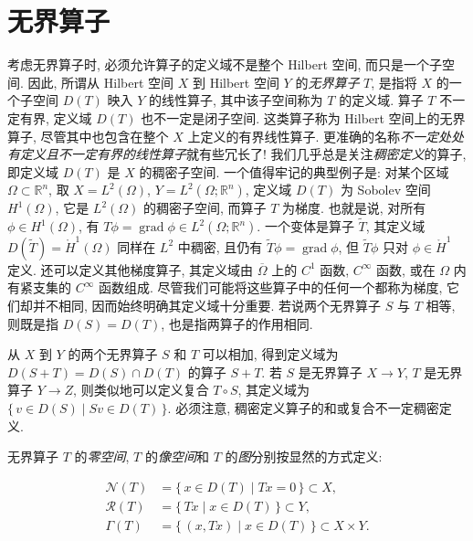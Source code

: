 \section{{无界算子}}\label{sec:unbounded-operators}

{考虑无界算子时, 必须允许算子的定义域不是整个 Hilbert 空间, 而只是一个子空间. 因此, 所谓从 Hilbert 空间 $X$ 到 Hilbert 空间 $Y$ 的\emph{无界算子} $T$, 是指将 $X$ 的一个子空间 $D(T)$ 映入 $Y$ 的线性算子, 其中该子空间称为 $T$ 的定义域. 算子 $T$ 不一定有界, 定义域 $D(T)$ 也不一定是闭子空间. 这类算子称为 Hilbert 空间上的无界算子, 尽管其中也包含在整个 $X$ 上定义的有界线性算子. 更准确的名称\emph{不一定处处有定义且不一定有界的线性算子}就有些冗长了! 我们几乎总是关注\emph{稠密定义}的算子, 即定义域 $D(T)$ 是 $X$ 的稠密子空间. 一个值得牢记的典型例子是: 对某个区域 $\Omega\subset\mathbb R^n$, 取 $X=L^2(\Omega)$, $Y=L^2(\Omega;\mathbb R^n)$, 定义域 $D(T)$ 为 Sobolev 空间 $H^1(\Omega)$, 它是 $L^2(\Omega)$ 的稠密子空间, 而算子 $T$ 为梯度. 也就是说, 对所有 $\phi\in H^1(\Omega)$, 有 $T\phi=\operatorname{grad}\phi\in L^2(\Omega;\mathbb R^n)$. 一个变体是算子 $\widetilde T$, 其定义域 $D(\widetilde T)=\mathring H^1(\Omega)$ 同样在 $L^2$ 中稠密, 且仍有 $\widetilde T\phi=\operatorname{grad}\phi$, 但 $\widetilde T\phi$ 只对 $\phi\in\mathring H^1$ 定义. 还可以定义其他梯度算子, 其定义域由 $\overline\Omega$ 上的 $C^1$ 函数, $C^\infty$ 函数, 或在 $\Omega$ 内有紧支集的 $C^\infty$ 函数组成. 尽管我们可能将这些算子中的任何一个都称为梯度, 它们却并不相同, 因而始终明确其定义域十分重要. 若说两个无界算子 $S$ 与 $T$ 相等, 则既是指 $D(S)=D(T)$, 也是指两算子的作用相同.}

{从 $X$ 到 $Y$ 的两个无界算子 $S$ 和 $T$ 可以相加, 得到定义域为 $D(S+T)=D(S)\cap D(T)$ 的算子 $S+T$. 若 $S$ 是无界算子 $X\to Y$, $T$ 是无界算子 $Y\to Z$, 则类似地可以定义复合 $T\circ S$, 其定义域为 $\{\,v\in D(S)\mid Sv\in D(T)\,\}$. 必须注意, 稠密定义算子的和或复合不一定稠密定义.}

{无界算子 $T$ 的\emph{零空间}, $T$ 的\emph{像空间}和 $T$ 的\emph{图}分别按显然的方式定义:}

\[
\begin{aligned}
\mathcal N(T)&=\{\,x\in D(T)\mid Tx=0\,\}\subset X,\\
\mathcal R(T)&=\{\,Tx\mid x\in D(T)\,\}\subset Y,\\
\Gamma(T)&=\{\,(x,Tx)\mid x\in D(T)\,\}\subset X\times Y.
\end{aligned}
\]

